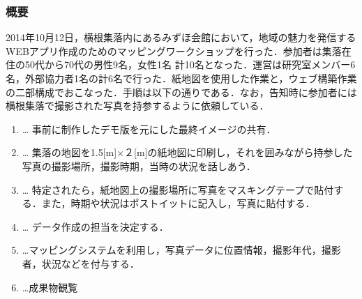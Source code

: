 \documentclass[a4paper]{jsarticle}
\begin{document}
\subsubsection{概要}
2014年10月12日，横根集落内にあるみずほ会館において，地域の魅力を発信するWEBアプリ作成のためのマッピングワークショップを行った．参加者は集落在住の50代から70代の男性9名，女性1名 計10名となった．運営は研究室メンバー6名，外部協力者1名の計6名で行った．紙地図を使用した作業と，ウェブ構築作業の二部構成でおこなった．手順は以下の通りである．なお，告知時に参加者には横根集落で撮影された写真を持参するように依頼している．\\
\begin{enumerate}
\item  … 事前に制作したデモ版を元にした最終イメージの共有．
\item  … 集落の地図を1.5[m]×２[m]の紙地図に印刷し，それを囲みながら持参した写真の撮影場所，撮影時期，当時の状況を話しあう．
\item … 特定されたら，紙地図上の撮影場所に写真をマスキングテープで貼付する．また，時期や状況はポストイットに記入し，写真に貼付する．

\item  … データ作成の担当を決定する．

\item …マッピングシステムを利用し，写真データに位置情報，撮影年代，撮影者，状況などを付与する．
\item …成果物観覧
\end{enumerate}
\end{document}
